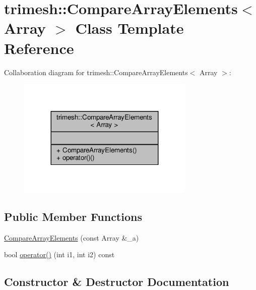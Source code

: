 \hypertarget{classtrimesh_1_1CompareArrayElements}{}\section{trimesh\+:\+:Compare\+Array\+Elements$<$ Array $>$ Class Template Reference}
\label{classtrimesh_1_1CompareArrayElements}


Collaboration diagram for trimesh\+:\+:Compare\+Array\+Elements$<$ Array $>$\+:\nopagebreak
\begin{figure}[H]
\begin{center}
\leavevmode
\includegraphics[width=239pt]{de/de6/classtrimesh_1_1CompareArrayElements__coll__graph}
\end{center}
\end{figure}
\subsection*{Public Member Functions}
\begin{DoxyCompactItemize}
\item 
\hyperlink{classtrimesh_1_1CompareArrayElements_ab0ce83e4afd5b5c63858d75ad39df3e9}{Compare\+Array\+Elements} (const Array \&\+\_\+a)
\item 
bool \hyperlink{classtrimesh_1_1CompareArrayElements_aba402709a16256f1b8a519996eacfc79}{operator()} (int i1, int i2) const
\end{DoxyCompactItemize}


\subsection{Constructor \& Destructor Documentation}
\mbox{\label{classtrimesh_1_1CompareArrayElements_ab0ce83e4afd5b5c63858d75ad39df3e9}} 

